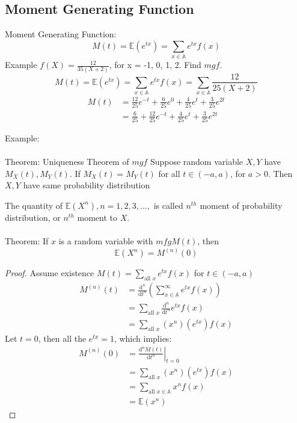 \documentclass{article}
\newcommand{\E}{\mathbb{E}}
\newcommand{\nder}[3]{\frac{\mathrm{d}^{#1} #2}{\mathrm{d} #3^{#1}}}
\begin{document}
\subsection{Moment Generating Function}
Moment Generating Function:
$$M(t) = \E(e^{tx}) = \sum_{x \in \mathbb{A}}e^{tx}f(x)$$
\noindent Example $f(X) = \frac{12}{35(X + 2)}$, for x = -1, 0, 1, 2. Find $mgf$.
$$M(t) = \E(e^{tx}) = \sum_{x \in \mathbb{A}}{e^{tx}f(x)} = \sum_{x \in \mathbb{A}}\frac{12}{25(X + 2)}$$
\begin{align*}
M(t) &= \frac{12}{25}e^{-t} + \frac{6}{25}e^0 + \frac{4}{25}e^t + \frac{3}{25}e^{2t} \\
     &= \frac{6}{25} + \frac{12}{25}e^{-t} + \frac{4}{25}e^t + \frac{3}{25}e^{2t}
\end{align*} 

\noindent Example:\\\\
Theorem: Uniqueness Theorem of $mgf$
Suppose random variable $X, Y$ have $M_{X}(t), M_{Y}(t)$. If $M_{X}(t) = M_{Y}(t)$ for all $t \in (-a, a)$, for $a > 0$. Then $X, Y$ have same probability distribution

\noindent The quantity of $\E(X^n), n = 1, 2, 3,...,$ is called $n^{th}$ moment of probability distribution, or $n^{th}$ moment to $X$.\\\\
\noindent Theorem: If $x$ is a random variable with $mfg M(t)$, then
$$\E(X^n) = M^{(n)}(0)$$

\begin{proof}
\noindent Assume existence $M(t) = \sum_{\text{all } x}e^{tx}f(x)$ for $t \in (-a, a)$
\begin{align*}
M^{(n)}(t) &= \nder{n}{}{t} (\sum_{x \in \mathbb{A}}^{\infty}e^{tx}f(x)) \\ 
         &= \sum_{\text{all } x} \nder{n}{}{t} e^{tx}f(x) \\
         &= \sum_{\text{all } x} (x^n)(e^{tx})f(x)  
\end{align*}
Let $t = 0$, then all the $e^{tx} = 1$, which implies:
\begin{align*}
M^{(n)}(0) &= \left. \nder{n}{M(t)}{t} \right|_{t = 0} \\
           &= \sum_{\text{all } x}(x^n)(e^{tx})f(x) \\
           &= \sum_{\text{all } x \in \mathbb{A}} x^nf(x) \\
           &= \E(x^n)
\end{align*}
\end{proof}
\end{document}
